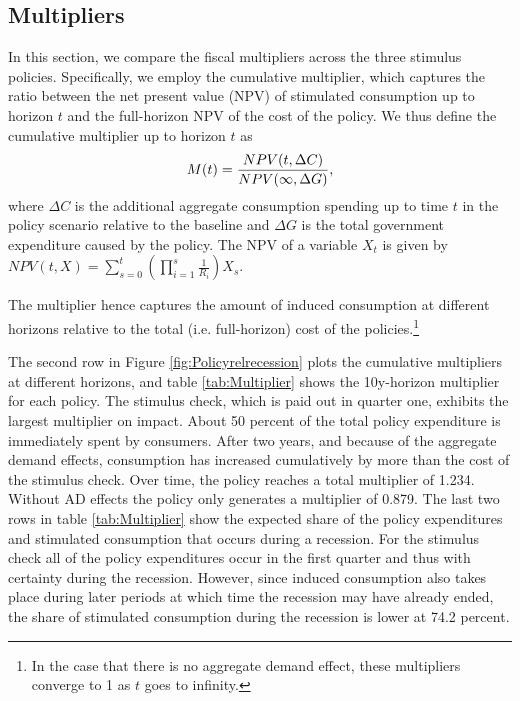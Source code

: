\documentclass[../HAFiscal]{subfiles}
\begin{document}
\subsection{Multipliers}
\whenintegrated{\label{sec:multipliers}} 

In this section, we compare the fiscal multipliers across the three stimulus policies.
Specifically, we employ the cumulative multiplier, which captures the ratio between the net present value (NPV) of stimulated consumption up to horizon $t$ and the full-horizon NPV of the cost of the policy.
We thus define the cumulative multiplier up to horizon $t$ as
\begin{equation}
  \label{eqn:cumMultiplier} 
  M(t) = \frac{NPV(t,\Delta C)}{NPV (\infty,\Delta G)},
\end{equation}
where $\Delta C$ is the additional aggregate consumption spending up to time $t$ in the policy scenario relative to the baseline and $\Delta G$ is the total government expenditure caused by the policy.
The NPV of a variable $X_t$ is given by
$NPV(t,X) = \sum_{s=0}^{t} \left( \prod_{i=1}^{s} \frac{1}{R_i} \right) X_s$.

The multiplier hence captures the amount of induced consumption at different horizons relative to the total (i.e.
full-horizon) cost of the policies.\footnote{In the case that there is no aggregate demand effect, these multipliers converge to 1 as $t$ goes to infinity.}

The second row in Figure \ref{fig:Policyrelrecession} plots the cumulative multipliers at different horizons, and table \ref{tab:Multiplier} shows the 10y-horizon multiplier for each policy.
The stimulus check, which is paid out in quarter one, exhibits the largest multiplier on impact.
About 50 percent of the total policy expenditure is immediately spent by consumers.
After two years, and because of the aggregate demand effects, consumption has increased cumulatively by more than the cost of the stimulus check.
Over time, the policy reaches a total multiplier of 1.234.
Without AD effects the policy only generates a multiplier of 0.879.
The last two rows in table \ref{tab:Multiplier} show the expected share of the policy expenditures and stimulated consumption that occurs during a recession.
For the stimulus check all of the policy expenditures occur in the first quarter and thus with certainty during the recession.
However, since induced consumption also takes place during later periods at which time the recession may have already ended, the share of stimulated consumption during the recession is lower at 74.2 percent.
\end{document}
